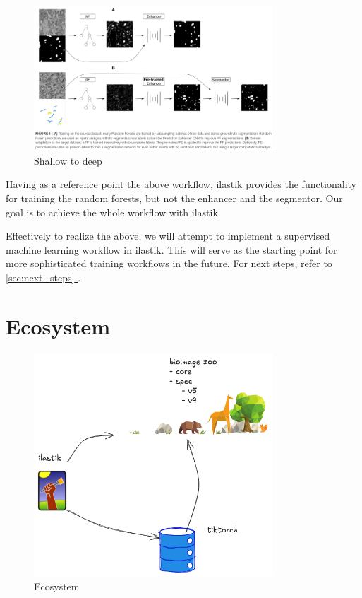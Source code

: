 \documentclass[12pt, a4paper]{article}
\newcommand*{\fullref}[1]{\hyperref[{#1}]{\ref*{#1} \nameref*{#1}}}
\begin{document}
\begin{figure}[h!]
    \centering
    \includegraphics[width=0.8\textwidth]{shallow2deep.png}
    \caption{Shallow to deep \cite{Matskevych2021.11.09.467925}}
\end{figure}

Having as a reference point the above workflow, ilastik provides the functionality for training the random forests, but not the enhancer and the segmentor. Our goal is to achieve the whole workflow with ilastik.

Effectively to realize the above, we will attempt to implement a supervised machine learning workflow in ilastik. This will serve as the starting point for more sophisticated training workflows in the future. For next steps, refer to \fullref{sec:next_steps}.

\clearpage

\section{Ecosystem}

\begin{figure}[h!]
    \centering
    \includegraphics[width=0.8\textwidth]{ecosystem.png}
    \caption{Ecosystem}
\end{figure}
\end{document}
